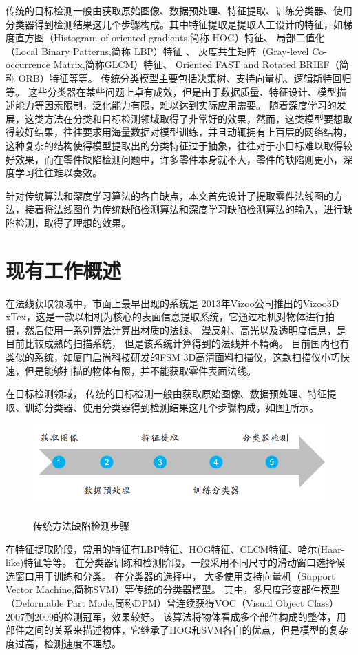 传统的目标检测一般由获取原始图像、数据预处理、特征提取、训练分类器、使用分类器得到检测结果这几个步骤构成。其中特征提取是提取人工设计的特征，如梯度直方图\cite{dalal2005histograms}（Histogram of oriented gradients,简称 HOG）特征、
局部二值化\cite{ojala2000gray}（Local Binary Patterns,简称 LBP）特征
、
灰度共生矩阵\cite{haralick1973textural}（Gray-level Co-occurrence Matrix,简称GLCM）特征、
Oriented FAST and Rotated BRIEF\cite{rublee2011orb}（简称 ORB）特征等等。
传统分类模型主要包括决策树、支持向量机、逻辑斯特回归等。
这些分类器在某些问题上卓有成效，但是由于数据质量、特征设计、模型描述能力等因素限制，泛化能力有限，难以达到实际应用需要。
随着深度学习的发展，这类方法在分类和目标检测领域取得了非常好的效果，然而，这类模型要想取得较好结果，往往要求用海量数据对模型训练，并且动辄拥有上百层的网络结构，这种复杂的结构使得模型提取出的分类特征过于抽象，往往对于小目标难以取得较好效果，而在零件缺陷检测问题中，许多零件本身就不大，零件的缺陷则更小，深度学习往往难以奏效。

针对传统算法和深度学习算法的各自缺点，本文首先设计了提取零件法线图的方法，接着将法线图作为传统缺陷检测算法和深度学习缺陷检测算法的输入，进行缺陷检测，取得了理想的效果。

\section{现有工作概述}

在法线获取领域中，市面上最早出现的系统是
2013年Vizoo公司推出的Vizoo3D xTex，这是一款以相机为核心的表面信息提取系统，它通过相机对物体进行拍摄，然后使用一系列算法计算出材质的法线、
漫反射、高光以及透明度信息，是目前比较成熟的扫描系统，
但是该系统计算得到的法线并不精确。
目前国内也有
类似的系统，如厦门启尚科技研发的FSM 3D高清面料扫描仪，这款扫描仪小巧快
速，但是能够扫描的物体有限，并不能获取零件表面法线。

在目标检测领域，
传统的目标检测一般由获取原始图像、数据预处理、特征提取、训练分类器、使用分类器得到检测结果这几个步骤构成，如图\ref{chuantongjiancebuzhou}所示。
\begin{figure}[htbp]
\centering
\includegraphics[width=1.0\linewidth]{figures/chuantongjiance.jpg}\\
\caption{传统方法缺陷检测步骤}\label{chuantongjiancebuzhou}
\end{figure}
在特征提取阶段，常用的特征有LBP特征、HOG特征、CLCM特征、哈尔\cite{viola2001rapid}(Haar-like)特征等等。
在分类器训练和检测阶段，一般采用不同尺寸的滑动窗口选择候选窗口用于训练和分类。
在分类器的选择中，
大多使用支持向量机\cite{hearst1998support}（Support Vector Machine,简称SVM）等传统的分类器模型。
其中，多尺度形变部件模型\cite{felzenszwalb2010object}（Deformable Part Mode,简称DPM）曾连续获得VOC（Visual Object Class）2007到2009的检测冠军，效果较好。
该算法将物体看成多个部件构成的整体，用部件之间的关系来描述物体，它继承了HOG和SVM各自的优点，但是模型的复杂度过高，检测速度不理想。

